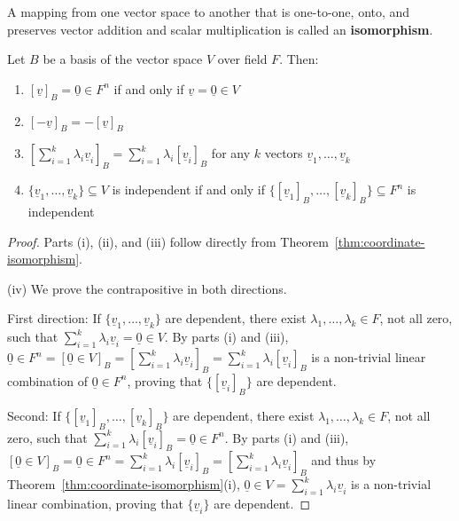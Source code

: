 \begin{definition}[Isomorphism]\label{def:isomorphism}
    A mapping from one vector space to another that is one-to-one, onto, and preserves vector addition and scalar multiplication is called an \textbf{isomorphism}.
\end{definition}

\begin{theorem}\label{thm:coordinate-properties}
    Let $B$ be a basis of the vector space $V$ over field $F$. Then:
    \begin{enumerate}[label=(\roman*)]
        \item $[\underline{v}]_B = \underline{0} \in F^n$ if and only if $\underline{v} = \underline{0} \in V$
        \item $[-\underline{v}]_B = -[\underline{v}]_B$
        \item $\left[\sum_{i=1}^{k} \lambda_i \underline{v}_i\right]_B = \sum_{i=1}^{k} \lambda_i [\underline{v}_i]_B$ for any $k$ vectors $\underline{v}_1, \ldots, \underline{v}_k$
        \item $\{\underline{v}_1, \ldots, \underline{v}_k\} \subseteq V$ is independent if and only if $\{[\underline{v}_1]_B, \ldots, [\underline{v}_k]_B\} \subseteq F^n$ is independent
    \end{enumerate}
\end{theorem}

\begin{proof}
    Parts (i), (ii), and (iii) follow directly from Theorem~\ref{thm:coordinate-isomorphism}.
    
    (iv) We prove the contrapositive in both directions.
    
    First direction: If $\{\underline{v}_1, \ldots, \underline{v}_k\}$ are dependent, there exist $\lambda_1, \ldots, \lambda_k \in F$, not all zero, such that $\sum_{i=1}^{k} \lambda_i \underline{v}_i = \underline{0} \in V$. By parts (i) and (iii), $\underline{0} \in F^n = [\underline{0} \in V]_B = \left[\sum_{i=1}^{k} \lambda_i \underline{v}_i\right]_B = \sum_{i=1}^{k} \lambda_i [\underline{v}_i]_B$ is a non-trivial linear combination of $\underline{0} \in F^n$, proving that $\{[\underline{v}_i]_B\}$ are dependent.
    
    Second: If $\{[\underline{v}_1]_B, \ldots, [\underline{v}_k]_B\}$ are dependent, there exist $\lambda_1, \ldots, \lambda_k \in F$, not all zero, such that $\sum_{i=1}^{k} \lambda_i [\underline{v}_i]_B = \underline{0} \in F^n$. By parts (i) and (iii), $[\underline{0} \in V]_B = \underline{0} \in F^n = \sum_{i=1}^{k} \lambda_i [\underline{v}_i]_B = \left[\sum_{i=1}^{k} \lambda_i \underline{v}_i\right]_B $ and thus by Theorem~\ref{thm:coordinate-isomorphism}(i), $\underline{0} \in V = \sum_{i=1}^{k} \lambda_i \underline{v}_i$ is a non-trivial linear combination, proving that $\{\underline{v}_i\}$ are dependent.
\end{proof}